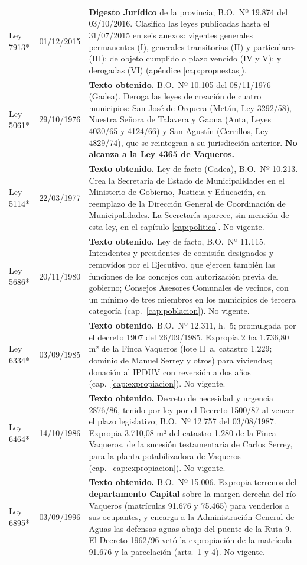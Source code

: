 \begin{longtable}{@{}p{3.2cm}p{1.9cm}p{7.9cm}@{}}
Ley 7913* & 01/12/2015 & \textbf{Digesto Jurídico} de la provincia; B.O.\ Nº 19.874 del 03/10/2016. Clasifica las leyes publicadas hasta el 31/07/2015 en seis anexos: vigentes generales permanentes (I), generales transitorias (II) y particulares (III); de objeto cumplido o plazo vencido (IV y V); y derogadas (VI) (apéndice \ref{cap:propuestas}). \\
Ley 5061* & 29/10/1976 & \textbf{Texto obtenido.} B.O.\ Nº 10.105 del 08/11/1976 (Gadea). Deroga las leyes de creación de cuatro municipios: San José de Orquera (Metán, Ley 3292/58), Nuestra Señora de Talavera y Gaona (Anta, Leyes 4030/65 y 4124/66) y San Agustín (Cerrillos, Ley 4829/74), que se reintegran a su jurisdicción anterior. \textbf{No alcanza a la Ley 4365 de Vaqueros.} \\
Ley 5114* & 22/03/1977 & \textbf{Texto obtenido.} Ley de facto (Gadea), B.O.\ Nº 10.213. Crea la Secretaría de Estado de Municipalidades en el Ministerio de Gobierno, Justicia y Educación, en reemplazo de la Dirección General de Coordinación de Municipalidades. La Secretaría aparece, sin mención de esta ley, en el capítulo \ref{cap:politica}. No vigente. \\
Ley 5686* & 20/11/1980 & \textbf{Texto obtenido.} Ley de facto, B.O.\ Nº 11.115. Intendentes y presidentes de comisión designados y removidos por el Ejecutivo, que ejercen también las funciones de los concejos con autorización previa del gobierno; Consejos Asesores Comunales de vecinos, con un mínimo de tres miembros en los municipios de tercera categoría (cap.\ \ref{cap:poblacion}). No vigente. \\
Ley 6334* & 03/09/1985 & \textbf{Texto obtenido.} B.O.\ Nº 12.311, h.\ 5; promulgada por el decreto 1907 del 26/09/1985. Expropia 2 ha 1.736,80 m² de la Finca Vaqueros (lote II~a, catastro 1.229; dominio de Manuel Serrey y otros) para viviendas; donación al IPDUV con reversión a dos años (cap.\ \ref{cap:expropiacion}). No vigente. \\
Ley 6464* & 14/10/1986 & \textbf{Texto obtenido.} Decreto de necesidad y urgencia 2876/86, tenido por ley por el Decreto 1500/87 al vencer el plazo legislativo; B.O.\ Nº 12.757 del 03/08/1987. Expropia 3.710,08 m² del catastro 1.280 de la Finca Vaqueros, de la sucesión testamentaria de Carlos Serrey, para la planta potabilizadora de Vaqueros (cap.\ \ref{cap:expropiacion}). No vigente. \\
Ley 6895* & 03/09/1996 & \textbf{Texto obtenido.} B.O.\ Nº 15.006. Expropia terrenos del \textbf{departamento Capital} sobre la margen derecha del río Vaqueros (matrículas 91.676 y 75.465) para venderlos a sus ocupantes, y encarga a la Administración General de Aguas las defensas aguas abajo del puente de la Ruta 9. El Decreto 1962/96 vetó la expropiación de la matrícula 91.676 y la parcelación (arts.\ 1 y 4). No vigente. \\

\end{longtable}
